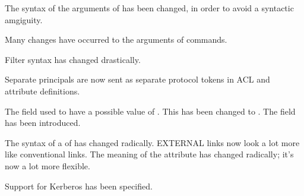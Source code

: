 The syntax of the arguments of
 has been changed, in order to avoid a syntactic
amgiguity.   

Many changes have occurred to the arguments of commands.  

Filter syntax has changed drastically.  

Separate principals are now sent as separate protocol tokens in ACL
and attribute definitions.

The  field used to have a possible value of
.  This has been changed to .  The
 field has been introduced.

The syntax of a  of  has changed
radically.  EXTERNAL links now look a lot more like conventional links.
The meaning of the  attribute has changed radically;
it's now a lot more flexible.

Support for Kerberos has been specified.


